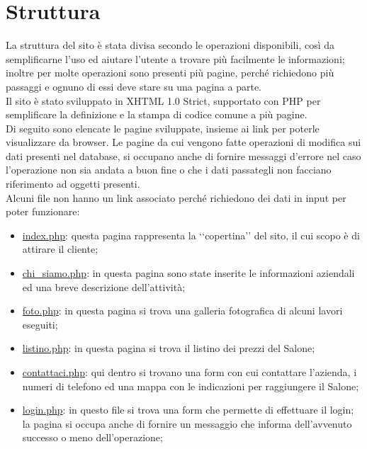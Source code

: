 \section{Struttura}{
	La struttura del sito è stata divisa secondo le operazioni disponibili, così da semplificarne l'uso ed aiutare l'utente a trovare più facilmente le informazioni; inoltre per molte operazioni sono presenti più pagine, perché richiedono più passaggi e ognuno di essi deve stare su una pagina a parte.
	\\
	Il sito è stato sviluppato in XHTML 1.0 Strict, supportato con PHP per semplificare la definizione e la stampa di codice comune a più pagine.
	\\
	Di seguito sono elencate le pagine sviluppate, insieme ai link per poterle visualizzare da browser. Le pagine da cui vengono fatte operazioni di modifica sui dati presenti nel database, si occupano anche di fornire messaggi d'errore nel caso l'operazione non sia andata a buon fine o che i dati passategli non facciano riferimento ad oggetti presenti.\\
	 Alcuni file non hanno un link associato perché richiedono dei dati in input per poter funzionare:
	\begin{itemize}\itemsep1pt
		\item \href{http://tecweb2016.studenti.math.unipd.it/smarches/}{index.php}: questa pagina rappresenta la ‘‘copertina’’ del sito, il cui scopo è di attirare il cliente;
		\item \href{http://tecweb2016.studenti.math.unipd.it/smarches/chi\_siamo.php}{chi\_siamo.php}: in questa pagina sono state inserite le informazioni aziendali ed una breve descrizione dell'attività;
		\item \href{http://tecweb2016.studenti.math.unipd.it/smarches/foto.php}{foto.php}: in questa pagina si trova una galleria fotografica di alcuni lavori eseguiti;
		\item \href{http://tecweb2016.studenti.math.unipd.it/smarches/listino.php}{listino.php}: in questa pagina si trova il listino dei prezzi del Salone;
		\item \href{http://tecweb2016.studenti.math.unipd.it/smarches/contattaci.php}{contattaci.php}: qui dentro si trovano una form con cui contattare l'azienda, i numeri di telefono ed una mappa con le indicazioni per raggiungere il Salone;
		\item \href{http://tecweb2016.studenti.math.unipd.it/smarches/login.php}{login.php}: in questo file si trova una form che permette di effettuare il login; la pagina si occupa anche di fornire un messaggio che informa dell'avvenuto successo o meno dell'operazione;

\end{itemize}}
